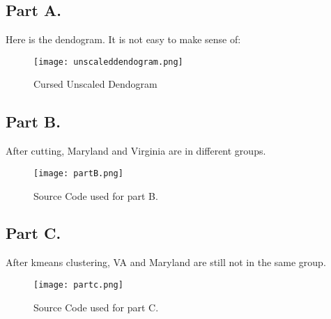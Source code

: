 \documentclass{article}
\begin{document}
\subsection*{Part A.}
Here is the dendogram. It is not easy to make sense of:
\begin{figure}[hbt!]
\centering
\texttt{[image: unscaleddendogram.png]}
\caption{Cursed Unscaled Dendogram}
\end{figure}
\subsection*{Part B.}
After cutting, Maryland and Virginia are in different groups.
\begin{figure}[hbt!]
\centering
\texttt{[image: partB.png]}
\caption{Source Code used for part B.}
\end{figure}

\subsection*{Part C.}
After kmeans clustering, VA and Maryland are still not in the same group.

\begin{figure}[hbt!]
\centering
\texttt{[image: partc.png]}
\caption{Source Code used for part C.}
\end{figure}
\end{document}
